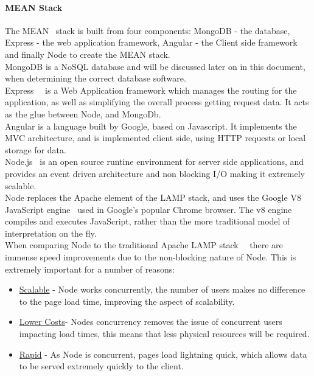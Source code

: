 \documentclass[preprint,12pt,3p]{elsarticle}
\begin{document}
\paragraph{MEAN Stack}
The MEAN~\cite{mean} stack is built from four components: MongoDB - the database, Express - the web application framework, Angular - the Client side framework and finally Node to create the MEAN stack.\\
MongoDB is a NoSQL database and will be discussed later on in this document, when determining the correct database software.\\
Express~\cite{express}~\cite{whatisexpress} is a Web Application framework which manages the routing for the application, as well as simplifying the overall process getting request data. It acts as the glue between Node, and MongoDb.\\
Angular is a language built by Google, based on Javascript. It implements the MVC architecture, and is implemented client side, using HTTP requests or local storage for data.\\
Node.js~\cite{nodejs} is an open source runtine environment for server side applications, and provides an event driven architecture and non blocking I/O making it extremely scalable.\\
Node replaces the Apache element of the LAMP stack, and uses the Google V8 JavaScript engine~\cite{v8engine} used in Google's popular Chrome browser. The v8 engine compiles and executes JavaScript, rather than the more traditional model of interpretation on the fly.\\
When comparing Node to the traditional Apache LAMP stack~\cite{phpvsnodejs}~\cite{nodejsvsapache} there are immense speed improvements due to the non-blocking nature of Node. This is extremely important for a number of reasons:
\begin{itemize}
  \item \underline{Scalable} - Node works concurrently, the number of users makes no difference to the page load time, improving the aspect of scalability.
  \item \underline{Lower Costs}- Nodes concurrency removes the issue of concurrent users impacting load times, this means that less physical resources will be required.
  \item \underline{Rapid} - As Node is concurrent, pages load lightning quick, which allows data to be served extremely quickly to the client.
\end{itemize}
\end{document}
